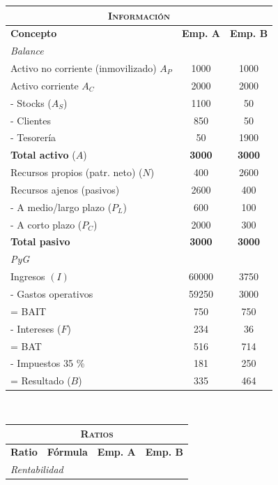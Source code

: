 \documentclass[nochap,palatino,notitlepage]{apuntes}
\begin{document}
\begin{table}[hbtp]
\begin{minipage}{\textwidth}
\centering
\footnotesize
\begin{tabular}{p{3.5cm}|c|c}
\multicolumn{3}{c}{\textsc{Información}} \\ \toprule
\textbf{Concepto} & \textbf{Emp. A} & \textbf{Emp. B} \\ \toprule
\multicolumn{3}{l}{\textit{Balance}} \\ \midrule
Activo no corriente (inmovilizado) $A_P$ & 1000 & 1000 \\
Activo corriente $A_C$ & 2000 & 2000 \\
\hspace{5pt} - Stocks ($A_S$) & 1100 & 50 \\
\hspace{5pt} - Clientes & 850 & 50 \\
\hspace{5pt} - Tesorería & 50 & 1900 \\
\textbf{Total activo} ($A$) & \textbf{3000} & \textbf{3000} \\ \midrule
Recursos propios (patr. neto) ($N$) & 400 & 2600 \\
Recursos ajenos (pasivos) & 2600 & 400 \\
\hspace{5pt} - A medio/largo plazo ($P_L$) & 600 & 100 \\
\hspace{5pt} - A corto plazo ($P_C$) & 2000 & 300 \\
\textbf{Total pasivo} & \textbf{3000} & \textbf{3000} \\ \midrule
\multicolumn{3}{l}{\textit{PyG}} \\ \midrule
Ingresos $(I)$ & 60000 & 3750 \\
- Gastos operativos & 59250 & 3000 \\
= BAIT & 750 & 750 \\
- Intereses ($F$) & 234 & 36 \\
= BAT & 516 & 714 \\
- Impuestos 35 \% & 181 & 250 \\
= Resultado ($B$) & 335 & 464
\end{tabular}
~
\begin{tabular}{p{2.5cm}|c|c|c}
\multicolumn{4}{c}{\textsc{Ratios}} \\ \toprule
\textbf{Ratio} & \textbf{Fórmula} & \textbf{Emp. A} & \textbf{Emp. B} \\ \toprule
\multicolumn{4}{l}{\textit{Rentabilidad}} \\ \midrule

\end{tabular}
\end{minipage}
\end{table}
\end{document}
